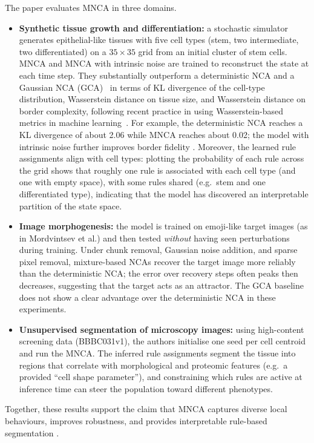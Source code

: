 The paper evaluates MNCA in three domains.
\begin{itemize}
  \item \textbf{Synthetic tissue growth and differentiation:} a stochastic simulator generates epithelial-like tissues with five cell types (stem, two intermediate, two differentiated) on a \(35\times 35\) grid from an initial cluster of stem cells. MNCA and MNCA with intrinsic noise are trained to reconstruct the state at each time step. They substantially outperform a deterministic NCA and a Gaussian NCA (GCA)~\cite{gnca_jeandelle2024} in terms of KL divergence of the cell-type distribution, Wasserstein distance on tissue size, and Wasserstein distance on border complexity, following recent practice in using Wasserstein-based metrics in machine learning~\cite{arjovsky2017wasserstein}. For example, the deterministic NCA reaches a KL divergence of about 2.06 while MNCA reaches about 0.02; the model with intrinsic noise further improves border fidelity \cite{mnca_milite2025}. Moreover, the learned rule assignments align with cell types: plotting the probability of each rule across the grid shows that roughly one rule is associated with each cell type (and one with empty space), with some rules shared (e.g.\ stem and one differentiated type), indicating that the model has discovered an interpretable partition of the state space.
  \item \textbf{Image morphogenesis:} the model is trained on emoji-like target images (as in Mordvintsev et al.) and then tested \emph{without} having seen perturbations during training. Under chunk removal, Gaussian noise addition, and sparse pixel removal, mixture-based NCAs recover the target image more reliably than the deterministic NCA; the error over recovery steps often peaks then decreases, suggesting that the target acts as an attractor. The GCA baseline does not show a clear advantage over the deterministic NCA in these experiments.
  \item \textbf{Unsupervised segmentation of microscopy images:} using high-content screening data (BBBC031v1), the authors initialise one seed per cell centroid and run the MNCA. The inferred rule assignments segment the tissue into regions that correlate with morphological and proteomic features (e.g.\ a provided ``cell shape parameter''), and constraining which rules are active at inference time can steer the population toward different phenotypes.
\end{itemize}
Together, these results support the claim that MNCA captures diverse local behaviours, improves robustness, and provides interpretable rule-based segmentation \cite{mnca_milite2025}.

